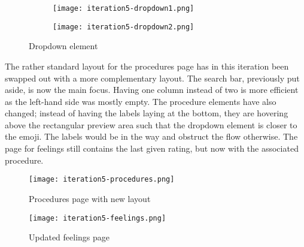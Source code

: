 \begin{figure}
    \centering
    \hspace{\fill}
    \begin{subfigure}[t]{0.45\textwidth}
        \centering
        \vspace{0pt}
        \texttt{[image: iteration5-dropdown1.png]}
        \label{fig:i5-dropdown1}
    \end{subfigure}
    \hspace{\fill}
    \begin{subfigure}[t]{0.45\textwidth}
        \centering
        \vspace{0pt}
        \texttt{[image: iteration5-dropdown2.png]}
        \label{fig:i5-dropdown2}
    \end{subfigure}
    \hspace*{\fill}
    \caption{Dropdown element}
    \label{fig:i5-dropdown}
\end{figure}

The rather standard layout for the procedures page has in this iteration been swapped out with a more complementary layout. The search bar, previously put aside, is now the main focus. Having one column instead of two is more efficient as the left-hand side was mostly empty. The procedure elements have also changed; instead of having the labels laying at the bottom, they are hovering above the rectangular preview area such that the dropdown element is closer to the emoji. The labels would be in the way and obstruct the flow otherwise. The page for feelings still contains the last given rating, but now with the associated procedure.

\begin{sidewaysfigure}
    \centering
    \hspace{\fill}
    \begin{minipage}{0.4\textwidth}
        \centering
        \texttt{[image: iteration5-procedures.png]}
        \caption{Procedures page with new layout}
        \label{fig:i5-procedures}
    \end{minipage}
    \hspace{\fill}
    \begin{minipage}{0.4\textwidth}
        \centering
        \texttt{[image: iteration5-feelings.png]}
        \caption{Updated feelings page}
        \label{fig:i5-feelings}
    \end{minipage}
    \hspace*{\fill}
\end{sidewaysfigure}

